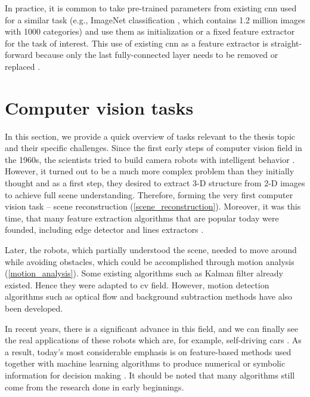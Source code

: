         In practice, it is common to take pre-trained parameters from existing \gls{cnn} used for a similar task (e.g., ImageNet classification \cite{russakovsky2015imagenet}, which contains 1.2 million images with 1000 categories) and use them as initialization or a fixed feature extractor for the task of interest. This use of existing \gls{cnn} as a feature extractor is straight-forward because only the last fully-connected layer needs to be removed or replaced \cite{cs231n}.
        
\section{Computer vision tasks}
    In this section, we provide a quick overview of tasks relevant to the thesis topic and their specific challenges. Since the first early steps of computer vision field in the 1960s, the scientists tried to build camera robots with intelligent behavior \cite{hutter2004universal, shalev2014understanding, Szeliski:2010:CVA:1941882}. However, it turned out to be a much more complex problem than they initially thought and as a first step, they desired to extract 3-D structure from 2-D images to achieve full scene understanding. Therefore, forming the very first computer vision task -- scene reconstruction (\ref{scene_reconstruction}). Moreover, it was this time, that many feature extraction algorithms that are popular today were founded, including edge detector and lines extractors \cite{Szeliski:2010:CVA:1941882}. 
    
    Later, the robots, which partially understood the scene, needed to move around while avoiding obstacles, which could be accomplished through motion analysis (\ref{motion_analysis}). Some existing algorithms such as Kalman filter \cite{kalman1960new} already existed. Hence they were adapted to \gls{cv} field. However, motion detection algorithms such as optical flow \cite{horn1981determining} and background subtraction methods \cite{piccardi2004background} have also been developed.

    In recent years, there is a significant advance in this field, and we can finally see the real applications of these robots which are, for example, self-driving cars \cite{levinson2011towards}. As a result, today's most considerable emphasis is on feature-based methods used together with machine learning algorithms to produce numerical or symbolic information for decision making \cite{goodfellow2016deep}. It should be noted that many algorithms still come from the research done in early beginnings. 
    
